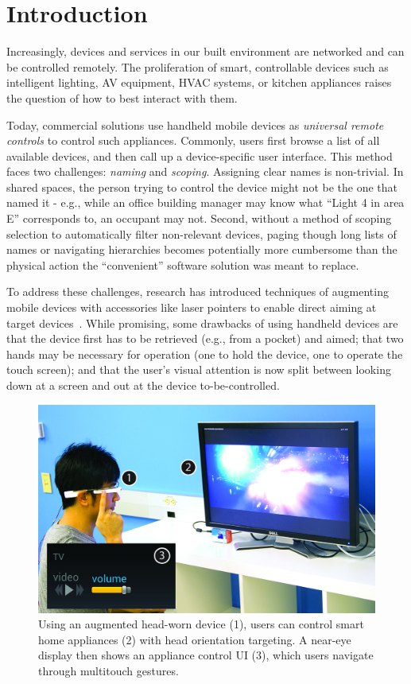 \section{Introduction}
Increasingly, devices and services in our built environment are networked and can be controlled remotely. The proliferation of smart, controllable devices such as intelligent lighting, AV equipment, HVAC systems, or kitchen appliances raises the question of how to best interact with them. 

Today, commercial solutions use handheld mobile devices as {\em universal remote controls} to control such appliances. Commonly, users first browse a list of all available devices, and then call up a device-specific user interface. This method faces two challenges: {\em naming} and {\em scoping}. Assigning clear names is non-trivial. In shared spaces, the person trying to control the device might not be the one that named it - e.g., while an office building manager may know what ``Light 4 in area E'' corresponds to, an occupant may not. Second, without a method of scoping selection to automatically filter non-relevant devices, paging though long lists of names or navigating hierarchies becomes potentially more cumbersome than the physical action the ``convenient'' software solution was meant to replace.

To address these challenges, research has introduced techniques of augmenting mobile devices with accessories like laser pointers to enable direct aiming at target devices~\cite{beigl_point_1999,patel_2-way_2003}. While promising, some drawbacks of using handheld devices are that the device first has to be retrieved (e.g., from a pocket) and aimed; that two hands may be necessary for operation (one to hold the device, one to operate the touch screen); and that the user's visual attention is now split between looking down at a screen and out at the device to-be-controlled. 

\begin{figure}[t]
\centering
\includegraphics[width=1.0\columnwidth]{figures/teaser.jpg}
\caption{Using an augmented head-worn device (1), users can control smart home appliances (2) with head orientation targeting. A near-eye display then shows an appliance control UI (3), which users navigate through multitouch gestures.}
\label{fig:teaser}
\end{figure}

